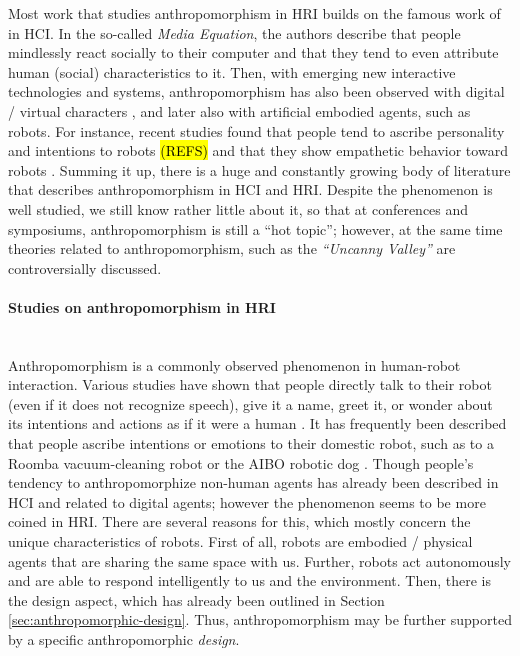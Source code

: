 \documentclass{frontiersSCNS} %
\begin{document}
Most work that studies anthropomorphism in HRI builds on the famous work of \cite{reeves_media_1996} in HCI. In the so-called \textit{Media Equation}, the authors describe that people mindlessly react socially to their computer and that they tend to even attribute human (social) characteristics to it. Then, with emerging new interactive technologies and systems, anthropomorphism has also been observed with digital / virtual characters \citep{reeves_media_1996,
nass_anthropocentrism_1995}, and later also with artificial embodied agents, such as robots. For instance, recent studies found that people tend to ascribe personality and intentions to robots \hl{(REFS)} and that they show empathetic behavior toward robots \cite{rosenthal-vonderputten_experimental_2013}. Summing it up, there is a huge and constantly growing body of literature that describes anthropomorphism in HCI and HRI. Despite the phenomenon is well studied, we still know rather little about it, so that at conferences and symposiums, anthropomorphism is still a ``hot topic''; however, at the same time theories related to anthropomorphism, such as the \textit{``Uncanny Valley''} are controversially discussed.


\paragraph*{Studies on anthropomorphism in HRI\\ \\}

Anthropomorphism is a commonly observed phenomenon in human-robot interaction. Various studies have shown that people directly talk to their robot (even if it does not recognize speech), give it a name, greet it, or wonder about its intentions and actions as if it were a human \citep{eyssel_anthropomorphic_2010,fink_anthropomorphic_2012,forlizzi_how_2007,fussell_how_2008,kiesler_anthropomorphic_2008}.
It has frequently been described that people ascribe intentions or emotions to their domestic robot, such as to a Roomba vacuum-cleaning robot \citep{krumm_my_2007,sung_robots_2009} or the AIBO robotic dog \citep{friedman_hardware_2003}. Though people's tendency to anthropomorphize non-human agents has already been described in HCI and related to digital agents; however the phenomenon seems to be more coined in HRI. There are several reasons for this, which mostly concern the unique characteristics of robots.
First of all, robots are embodied / physical agents that are sharing the same space with us. 
Further, robots act autonomously and are able to respond intelligently to us and the environment.
Then, there is the design aspect, which has already been outlined in Section \ref{sec:anthropomorphic-design}. Thus, anthropomorphism may be further supported by a specific anthropomorphic \emph{design}. 
\end{document}

